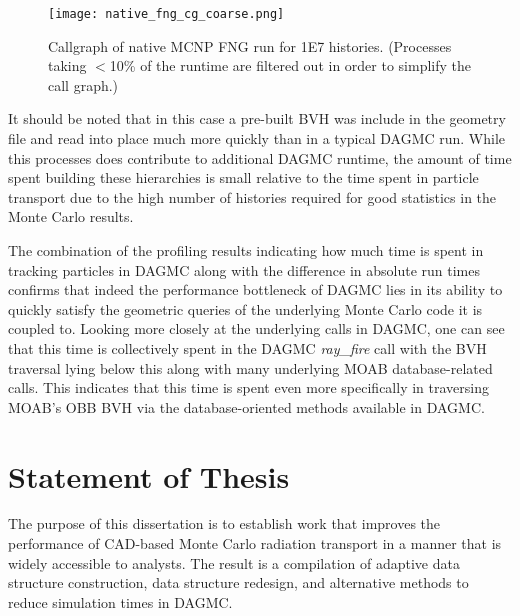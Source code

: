 \begin{figure}[H]
  \centering
  \caption{Callgraph of native MCNP FNG run for 1E7 histories. (Processes taking
    $<$10\% of the runtime are filtered out in order to simplify the call
    graph.)}
  \label{mcnp-fng-coarse}
  \texttt{[image: native\_fng\_cg\_coarse.png]}
\end{figure}


It should be noted that in this case a pre-built BVH was include in
the geometry file and read into place much more quickly than in a typical DAGMC
run. While this processes does contribute to additional DAGMC runtime, the
amount of time spent building these hierarchies is small relative to the time
spent in particle transport due to the high number of histories required for
good statistics in the Monte Carlo results.

The combination of the profiling results indicating how much time is spent in
tracking particles in DAGMC along with the difference in absolute run times
confirms that indeed the performance bottleneck of DAGMC lies in its ability to
quickly satisfy the geometric queries of the underlying Monte Carlo code it is
coupled to. Looking more closely at the underlying calls in DAGMC, one can see
that this time is collectively spent in the DAGMC \textit{ray\_fire} call with
the BVH traversal lying below this along with many underlying MOAB
database-related calls. This indicates that this time is spent even more
specifically in traversing MOAB's OBB BVH via the database-oriented methods
available in DAGMC.

\section{Statement of Thesis}

The purpose of this dissertation is to establish work that improves the
performance of CAD-based Monte Carlo radiation transport in a manner that is
widely accessible to analysts. The result is a compilation of adaptive data
structure construction, data structure redesign, and alternative methods to
reduce simulation times in DAGMC.



